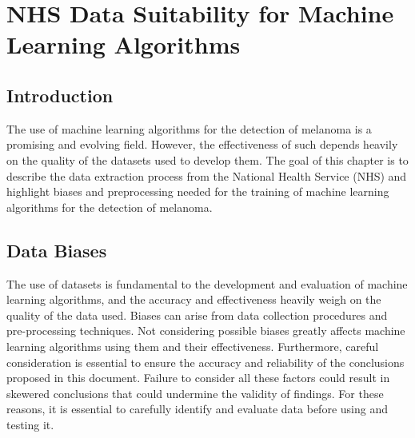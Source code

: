 \chapter{NHS Data Suitability for Machine Learning Algorithms}

\section{Introduction}
The use of machine learning algorithms for the detection of melanoma is a promising and evolving field. However, the effectiveness of such depends heavily on the quality of the datasets used to develop them\cite{}. The goal of this chapter is to describe the data extraction process from the National Health Service (NHS) and highlight biases and preprocessing needed for the training of machine learning algorithms for the detection of melanoma.  

\section{Data Biases}
The use of datasets is fundamental to the development and evaluation of machine learning algorithms, and the accuracy and effectiveness heavily weigh on the quality of the data used. Biases can arise from data collection procedures and pre-processing techniques. Not considering possible biases greatly affects machine learning algorithms using them and their effectiveness. Furthermore, careful consideration is essential to ensure the accuracy and reliability of the conclusions proposed in this document. Failure to consider all these factors could result in skewered conclusions that could undermine the validity of findings. For these reasons, it is essential to carefully identify and evaluate data before using and testing it.

